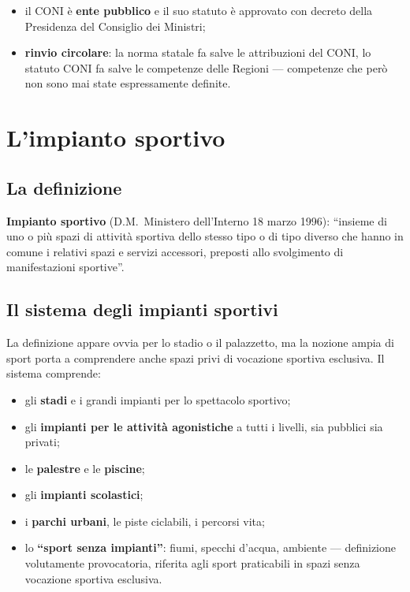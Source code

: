 \begin{itemize}
  \item il CONI è \textbf{ente pubblico} e il suo statuto è approvato con decreto della Presidenza
    del Consiglio dei Ministri;
  \item \textbf{rinvio circolare}: la norma statale fa salve le attribuzioni del CONI, lo statuto
    CONI fa salve le competenze delle Regioni --- competenze che però non sono mai state
    espressamente definite.
\end{itemize}

\section{L'impianto sportivo}

\subsection{La definizione}

\textbf{Impianto sportivo} (D.M.\ Ministero dell'Interno 18 marzo 1996): ``insieme di uno o più
spazi di attività sportiva dello stesso tipo o di tipo diverso che hanno in comune i relativi
spazi e servizi accessori, preposti allo svolgimento di manifestazioni sportive''.

\subsection{Il sistema degli impianti sportivi}

La definizione appare ovvia per lo stadio o il palazzetto, ma la nozione ampia di sport porta a
comprendere anche spazi privi di vocazione sportiva esclusiva. Il sistema comprende:

\begin{itemize}
  \item gli \textbf{stadi} e i grandi impianti per lo spettacolo sportivo;
  \item gli \textbf{impianti per le attività agonistiche} a tutti i livelli, sia pubblici sia
    privati;
  \item le \textbf{palestre} e le \textbf{piscine};
  \item gli \textbf{impianti scolastici};
  \item i \textbf{parchi urbani}, le piste ciclabili, i percorsi vita;
  \item lo \textbf{``sport senza impianti''}: fiumi, specchi d'acqua, ambiente --- definizione
    volutamente provocatoria, riferita agli sport praticabili in spazi senza vocazione sportiva
    esclusiva.
\end{itemize}

